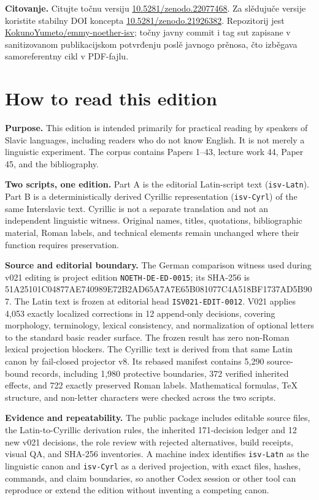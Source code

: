 \documentclass[11pt]{article}
\newcommand{\doiurl}[1]{\href{https://doi.org/#1}{#1}}
\newcommand{\repo}{\href{https://github.com/KokunoYumeto/emmy-noether-isv}{KokunoYumeto/emmy-noether-isv}}
\newcommand{\smallhash}[1]{{\ttfamily\footnotesize #1}}
\begin{document}
\textbf{Citovanje.} Citujte točnu versiju \doiurl{10.5281/zenodo.22077468}. Za slědujuče versije koristite stabilny DOI koncepta \doiurl{10.5281/zenodo.21926382}. Repozitorij jest \repo; točny javny commit i tag sut zapisane v sanitizovanom publikacijskom potvrđenju poslě javnogo prěnosa, čto izběgava samoreferentny cikl v PDF-fajlu.
\clearpage

\section*{How to read this edition}

\textbf{Purpose.} This edition is intended primarily for practical reading by speakers of Slavic languages, including readers who do not know English. It is not merely a linguistic experiment. The corpus contains Papers 1--43, lecture work 44, Paper 45, and the bibliography.

\textbf{Two scripts, one edition.} Part A is the editorial Latin-script text (\texttt{isv-Latn}). Part B is a deterministically derived Cyrillic representation (\texttt{isv-Cyrl}) of the same Interslavic text. Cyrillic is not a separate translation and not an independent linguistic witness. Original names, titles, quotations, bibliographic material, Roman labels, and technical elements remain unchanged where their function requires preservation.

\textbf{Source and editorial boundary.} The German comparison witness used during v021 editing is project edition \texttt{NOETH-DE-ED-0015}; its SHA-256 is
\smallhash{51A25101C04877AE740989E72B2AD65A7A7E65B081077C4A518BF1737AD5B907}.
The Latin text is frozen at editorial head \texttt{ISV021-EDIT-0012}. V021 applies 4,053 exactly localized corrections in 12 append-only decisions, covering morphology, terminology, lexical consistency, and normalization of optional letters to the standard basic reader surface. The frozen result has zero non-Roman lexical projection blockers. The Cyrillic text is derived from that same Latin canon by fail-closed projector v8. Its rebased manifest contains 5,290 source-bound records, including 1,980 protective boundaries, 372 verified inherited effects, and 722 exactly preserved Roman labels. Mathematical formulas, TeX structure, and non-letter characters were checked across the two scripts.

\textbf{Evidence and repeatability.} The public package includes editable source files, the Latin-to-Cyrillic derivation rules, the inherited 171-decision ledger and 12 new v021 decisions, the role review with rejected alternatives, build receipts, visual QA, and SHA-256 inventories. A machine index identifies \texttt{isv-Latn} as the linguistic canon and \texttt{isv-Cyrl} as a derived projection, with exact files, hashes, commands, and claim boundaries, so another Codex session or other tool can reproduce or extend the edition without inventing a competing canon.
\end{document}
